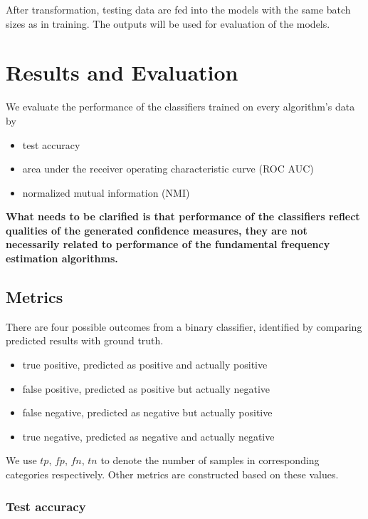 \documentclass[11pt,a4paper]{report}
\begin{document}
\bigskip

After transformation, testing data are fed into the models with the same batch sizes as in training.
The outputs will be used for evaluation of the models.

\chapter{Results and Evaluation}

We evaluate the performance of the classifiers trained on every algorithm's data by

\begin{itemize}
  \item test accuracy
  \item area under the receiver operating characteristic curve (ROC AUC)
  \item normalized mutual information (NMI)
\end{itemize}

\begin{mdframed}
\textbf{What needs to be clarified is that performance of the classifiers reflect qualities of the generated confidence measures, they are not necessarily related to performance of the fundamental frequency estimation algorithms.}
\end{mdframed}

\section{Metrics}

There are four possible outcomes from a binary classifier, identified by comparing predicted results with ground truth.

\begin{itemize}
  \item true positive, predicted as positive and actually positive
  \item false positive, predicted as positive but actually negative
  \item false negative, predicted as negative but actually positive
  \item true negative, predicted as negative and actually negative
\end{itemize}

We use \(tp\), \(fp\), \(fn\), \(tn\) to denote the number of samples in corresponding categories respectively.
Other metrics are constructed based on these values.

\subsection{Test accuracy}
\end{document}
